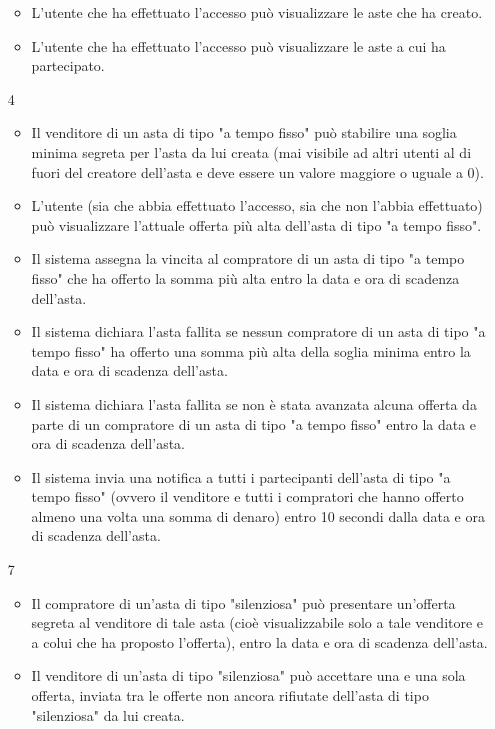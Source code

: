 \begin{itemize}
\begin{itemize}
                    \item L'utente che ha effettuato l'accesso può visualizzare le aste che ha creato.
                    \item L'utente che ha effettuato l'accesso può visualizzare le aste a cui ha partecipato.
                \end{itemize}
            \item[4]
                \begin{itemize}
                    \item Il venditore di un asta di tipo "a tempo fisso" può stabilire una soglia minima segreta per l'asta da lui creata (mai visibile ad altri utenti al di fuori del creatore dell'asta e deve essere un valore maggiore o uguale a 0).
                    \item L'utente (sia che abbia effettuato l'accesso, sia che non l'abbia effettuato) può visualizzare l'attuale offerta più alta dell'asta di tipo "a tempo fisso".
                    \item Il sistema assegna la vincita al compratore di un asta di tipo "a tempo fisso" che ha offerto la somma più alta entro la data e ora di scadenza dell'asta.
                    \item Il sistema dichiara l'asta fallita se nessun compratore di un asta di tipo "a tempo fisso" ha offerto una somma più alta della soglia minima entro la data e ora di scadenza dell'asta.
                    \item Il sistema dichiara l'asta fallita se non è stata avanzata alcuna offerta da parte di un compratore di un asta di tipo "a tempo fisso" entro la data e ora di scadenza dell'asta.
                    \item Il sistema invia una notifica a tutti i partecipanti dell'asta di tipo "a tempo fisso" (ovvero il venditore e tutti i compratori che hanno offerto almeno una volta una somma di denaro) entro 10 secondi dalla data e ora di scadenza dell'asta.
                \end{itemize}
            \item[7] 
                \begin{itemize}
                    \item Il compratore di un'asta di tipo "silenziosa" può presentare un'offerta segreta al venditore di tale asta (cioè visualizzabile solo a tale venditore e a colui che ha proposto l'offerta), entro la data e ora di scadenza dell'asta.
                    \item Il venditore di un'asta di tipo "silenziosa" può accettare una e una sola offerta, inviata tra le offerte non ancora rifiutate dell'asta di tipo "silenziosa" da lui creata.

\end{itemize}
\end{itemize}
